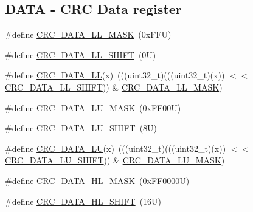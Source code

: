 \subsection*{D\+A\+TA -\/ C\+RC Data register}
\begin{DoxyCompactItemize}
\item 
\#define \mbox{\hyperlink{group___c_r_c___register___masks_gab3fd3443e50946adc0be6c46cfac2b4d}{C\+R\+C\+\_\+\+D\+A\+T\+A\+\_\+\+L\+L\+\_\+\+M\+A\+SK}}~(0x\+F\+F\+U)
\item 
\#define \mbox{\hyperlink{group___c_r_c___register___masks_gaf8ecef51d22d384bc8ab987dfb808f49}{C\+R\+C\+\_\+\+D\+A\+T\+A\+\_\+\+L\+L\+\_\+\+S\+H\+I\+FT}}~(0\+U)
\item 
\#define \mbox{\hyperlink{group___c_r_c___register___masks_ga5c2d2d988b40b375080e1e6e63ba3f77}{C\+R\+C\+\_\+\+D\+A\+T\+A\+\_\+\+LL}}(x)~(((uint32\+\_\+t)(((uint32\+\_\+t)(x)) $<$$<$ \mbox{\hyperlink{group___c_r_c___register___masks_gaf8ecef51d22d384bc8ab987dfb808f49}{C\+R\+C\+\_\+\+D\+A\+T\+A\+\_\+\+L\+L\+\_\+\+S\+H\+I\+FT}})) \& \mbox{\hyperlink{group___c_r_c___register___masks_gab3fd3443e50946adc0be6c46cfac2b4d}{C\+R\+C\+\_\+\+D\+A\+T\+A\+\_\+\+L\+L\+\_\+\+M\+A\+SK}})
\item 
\#define \mbox{\hyperlink{group___c_r_c___register___masks_ga270ddfffb4376c63d7dcb6c67ec26ac0}{C\+R\+C\+\_\+\+D\+A\+T\+A\+\_\+\+L\+U\+\_\+\+M\+A\+SK}}~(0x\+F\+F00\+U)
\item 
\#define \mbox{\hyperlink{group___c_r_c___register___masks_ga1ff4f24e49d987429fc4bf9515a37d40}{C\+R\+C\+\_\+\+D\+A\+T\+A\+\_\+\+L\+U\+\_\+\+S\+H\+I\+FT}}~(8\+U)
\item 
\#define \mbox{\hyperlink{group___c_r_c___register___masks_ga567014ec3cf8760d4e4502866c31ef00}{C\+R\+C\+\_\+\+D\+A\+T\+A\+\_\+\+LU}}(x)~(((uint32\+\_\+t)(((uint32\+\_\+t)(x)) $<$$<$ \mbox{\hyperlink{group___c_r_c___register___masks_ga1ff4f24e49d987429fc4bf9515a37d40}{C\+R\+C\+\_\+\+D\+A\+T\+A\+\_\+\+L\+U\+\_\+\+S\+H\+I\+FT}})) \& \mbox{\hyperlink{group___c_r_c___register___masks_ga270ddfffb4376c63d7dcb6c67ec26ac0}{C\+R\+C\+\_\+\+D\+A\+T\+A\+\_\+\+L\+U\+\_\+\+M\+A\+SK}})
\item 
\#define \mbox{\hyperlink{group___c_r_c___register___masks_ga4d36f0e2640b258579276ada9dbc68b1}{C\+R\+C\+\_\+\+D\+A\+T\+A\+\_\+\+H\+L\+\_\+\+M\+A\+SK}}~(0x\+F\+F0000\+U)
\item 
\#define \mbox{\hyperlink{group___c_r_c___register___masks_gae717e6022d6dd5e4e72cc3386e7ccc6b}{C\+R\+C\+\_\+\+D\+A\+T\+A\+\_\+\+H\+L\+\_\+\+S\+H\+I\+FT}}~(16\+U)
\item 

\end{DoxyCompactItemize}

